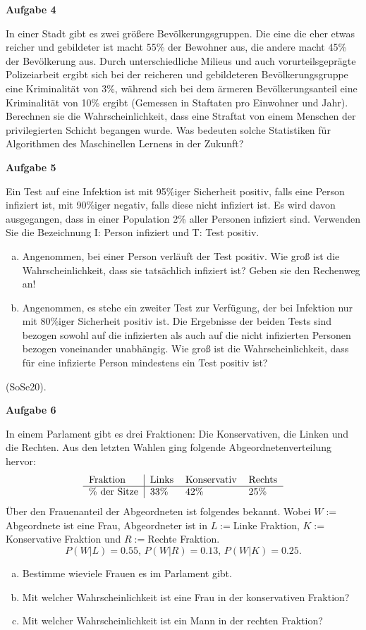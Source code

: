 \documentclass[a4paper,12pt]{article}
\newcommand{\Aufgabe}[1]{
  {
  \vspace*{0.5cm}
  \textsf{\textbf{Aufgabe #1}}
  \vspace*{0.2cm}
  
  }
}
\begin{document}
\Aufgabe{4}
In einer Stadt gibt es zwei größere Bevölkerungsgruppen. Die eine die eher etwas reicher und gebildeter ist macht 55\% der Bewohner aus, die andere macht 45\% der Bevölkerung aus. Durch unterschiedliche Milieus und auch vorurteilsgeprägte Polizeiarbeit ergibt sich bei der reicheren und gebildeteren Bevölkerungsgruppe eine Kriminalität von 3\%, während sich bei dem ärmeren Bevölkerungsanteil eine Kriminalität von 10\% ergibt (Gemessen in Staftaten pro Einwohner und Jahr). Berechnen sie die Wahrscheinlichkeit, dass eine Straftat von einem Menschen der privilegierten Schicht begangen wurde. Was bedeuten solche Statistiken für Algorithmen des Maschinellen Lernens in der Zukunft?


\Aufgabe{5}
Ein Test auf eine Infektion ist mit 95\%iger Sicherheit positiv, falls eine Person infiziert ist, mit 90\%iger negativ, falls diese nicht infiziert ist.
Es wird davon ausgegangen, dass in einer Population 2\% aller Personen infiziert sind. Verwenden Sie die Bezeichnung I: Person infiziert und T: Test positiv.
\begin{enumerate}[a)]
\item Angenommen, bei einer Person verläuft der Test positiv. Wie groß ist die Wahrscheinlichkeit, dass sie tatsächlich infiziert ist? Geben sie den Rechenweg an!
\item Angenommen, es stehe ein zweiter Test zur Verfügung, der bei Infektion nur mit 80\%iger Sicherheit positiv ist. Die Ergebnisse der beiden Tests sind bezogen sowohl auf die infizierten als auch auf die nicht infizierten Personen bezogen voneinander unabhängig.
Wie groß ist die Wahrscheinlichkeit, dass für eine infizierte Person mindestens ein Test positiv ist?
\end{enumerate}
 (SoSe20).
 
 
\Aufgabe{6}
In einem Parlament gibt es drei Fraktionen: Die Konservativen, die Linken und die Rechten.
Aus den letzten Wahlen ging folgende Abgeordnetenverteilung hervor:
$$
\begin{tabular}[h]{l|lllllllll}
Fraktion & Links & Konservativ & Rechts  \\
\hline
\% der Sitze & 33\% & 42\% & 25\%   \\
\end{tabular}
$$
Über den Frauenanteil der Abgeordneten ist folgendes bekannt. Wobei $W:=$Abgeordnete ist eine Frau, Abgeordneter ist in $L:=$Linke Fraktion, $K:=$Konservative Fraktion und $R:=$Rechte Fraktion.
$$
P(W|L) =0.55\text{,    }P(W|R)=0.13\text{,    }P(W|K)=0.25.
$$
\begin{enumerate}[a)]
\item Bestimme wieviele Frauen es im Parlament gibt.
\item Mit welcher Wahrscheinlichkeit ist eine Frau in der konservativen Fraktion?
\item Mit welcher Wahrscheinlichkeit ist ein Mann in der rechten Fraktion?
\end{enumerate}
\end{document}

